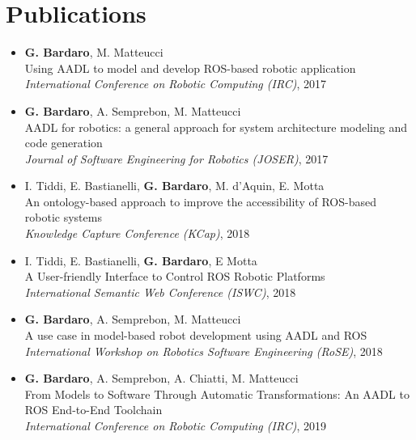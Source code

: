 \newpage

\section{Publications}
\begin{itemize}
\item \textbf{G. Bardaro}, M. Matteucci \\
Using AADL to model and develop ROS-based robotic application~\cite{bardaro2017using} \\
\textit{International Conference on Robotic Computing (IRC)}, 2017
\item \textbf{G. Bardaro}, A. Semprebon, M. Matteucci \\
AADL for robotics: a general approach for system architecture modeling and code generation~\cite{bardaro2017aadl} \\
\textit{Journal of Software Engineering for Robotics (JOSER)}, 2017
\item I. Tiddi, E. Bastianelli, \textbf{G. Bardaro}, M. d'Aquin, E. Motta \\
An ontology-based approach to improve the accessibility of ROS-based robotic systems~\cite{tiddi2017ontology} \\
\textit{Knowledge Capture Conference (KCap)}, 2018 \\
\item I. Tiddi, E. Bastianelli, \textbf{G. Bardaro}, E Motta \\
A User-friendly Interface to Control ROS Robotic Platforms~\cite{tiddi2018user} \\
\textit{International Semantic Web Conference (ISWC)}, 2018
\item \textbf{G. Bardaro}, A. Semprebon, M. Matteucci \\
A use case in model-based robot development using AADL and ROS~\cite{bardaro2018use} \\
\textit{International Workshop on Robotics Software Engineering (RoSE)}, 2018
\item \textbf{G. Bardaro}, A. Semprebon, A. Chiatti, M. Matteucci \\
From Models to Software Through Automatic Transformations: An AADL to ROS End-to-End Toolchain~\cite{bardaro2019models} \\
\textit{International Conference on Robotic Computing (IRC)}, 2019
\end{itemize}

